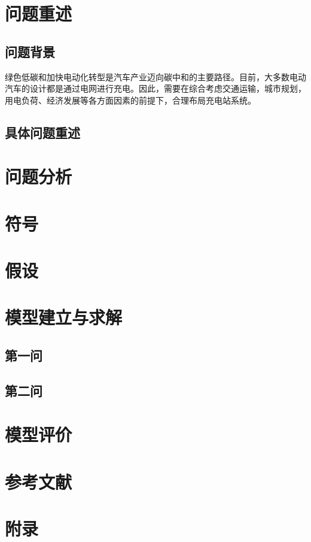 \documentclass[12pt, a4paper, oneside]{ctexart}
\begin{document}
    \begin{abstract}
        
    \end{abstract}
\newpage
    \section{问题重述}
    \subsection{问题背景}
    绿色低碳和加快电动化转型是汽车产业迈向碳中和的主要路径。目前，大多数电动汽车的设计都是通过电网进行充电。因此，需要在综合考虑交通运输，城市规划，用电负荷、经济发展等各方面因素的前提下，合理布局充电站系统。
    \subsection{具体问题重述}
    \section{问题分析}
    
    \section{符号}

    \section{假设}

    \section{模型建立与求解}
    \subsection{第一问}

    \subsection{第二问}

    \section{模型评价}

    \section{参考文献}

    \section{附录}
\end{document}
